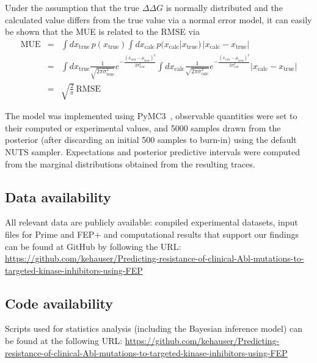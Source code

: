\documentclass[phd,tocprelim]{cornell}
\begin{document}
Under the assumption that the true $\Delta \Delta G$ is normally distributed and the calculated value differs from the true value via a normal error model, it can easily be shown that the MUE is related to the RMSE via
\begin{eqnarray}
\mathrm{MUE} &=& \int dx_\mathrm{true} \, p(x_\mathrm{true}) \int dx_\mathrm{calc} \, p(x_\mathrm{calc} | x_\mathrm{true}) \, | x_\mathrm{calc} - x_\mathrm{true} | \\
&=& \int dx_\mathrm{true} \frac{1}{\sqrt{2 \pi \sigma_\mathrm{true}^2}} e^{-\frac{(x_\mathrm{true} - \mu_\mathrm{true})^2}{2 \sigma_\mathrm{true}^2}} \int dx_\mathrm{calc} \frac{1}{\sqrt{2 \pi \sigma_\mathrm{calc}^2}} e^{-\frac{(x_\mathrm{calc} - \mu_\mathrm{true})^2}{2 \sigma_\mathrm{calc}^2}} | x_\mathrm{calc} - x_\mathrm{true} | \\
&=& \sqrt{\frac{2}{\pi}} \, \mathrm{RMSE} 
\end{eqnarray}

The model was implemented using PyMC3~\citep{pymc3}, observable quantities were set to their computed or experimental values, and 5000 samples drawn from the posterior (after discarding an initial 500 samples to burn-in) using the default NUTS sampler.
Expectations and posterior predictive intervals were computed from the marginal distributions obtained from the resulting traces.


\subsection{Data availability}
All relevant data are publicly available: compiled experimental datasets, input files for Prime and FEP+ and computational results that support our findings can be found at GitHub by following the URL: \url{https://github.com/kehauser/Predicting-resistance-of-clinical-Abl-mutations-to-targeted-kinase-inhibitors-using-FEP}

\subsection{Code availability}
Scripts used for statistics analysis (including the Bayesian inference model) can be found at the following URL: \url{https://github.com/kehauser/Predicting-resistance-of-clinical-Abl-mutations-to-targeted-kinase-inhibitors-using-FEP}



\end{document}
